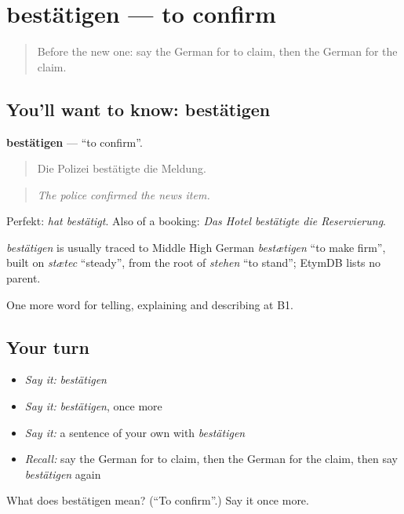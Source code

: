 \section[bestätigen]{bestätigen — to confirm}

\label{lesson:GE-C274-bestaetigen}



\begin{quote}
Before the new one: say the German for to claim, then the German for the claim.
\end{quote}

\subsection*{You'll want to know: bestätigen}
\textbf{bestätigen} — \textquotedblleft{}to confirm\textquotedblright{}.

\begin{quote}
Die Polizei bestätigte die Meldung.
\end{quote}

\begin{quote}
\emph{The police confirmed the news item.}
\end{quote}

Perfekt: \emph{hat bestätigt}. Also of a booking: \emph{Das Hotel bestätigte die Reservierung}.

\begin{cousinweb}
\emph{bestätigen} is usually traced to Middle High German \emph{bestætigen} \textquotedblleft{}to make firm\textquotedblright{}, built on \emph{stætec} \textquotedblleft{}steady\textquotedblright{}, from the root of \emph{stehen} \textquotedblleft{}to stand\textquotedblright{}; EtymDB lists no parent.
\end{cousinweb}

\begin{grammarlens}[title={What you've built}]
One more word for telling, explaining and describing at B1.
\end{grammarlens}

\subsection*{Your turn}
\begin{itemize}
\raggedright
  \item \emph{Say it:} \emph{bestätigen}
  \item \emph{Say it:} \emph{bestätigen}, once more
  \item \emph{Say it:} a sentence of your own with \emph{bestätigen}
  \item \emph{Recall:} say the German for to claim, then the German for the claim, then say \emph{bestätigen} again
\end{itemize}

\begin{tcolorbox}[breakable,colback=teal!4,colframe=teal!35!black,title={Before you move on}]
What does bestätigen mean? (\textquotedblleft{}To confirm\textquotedblright{}.) Say it once more.
\end{tcolorbox}
